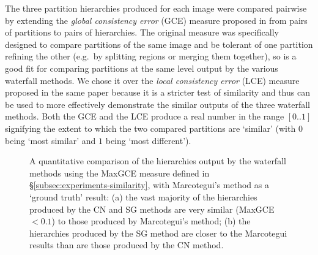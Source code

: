 \documentclass[preprint,a4paper]{elsarticle}
\newenvironment{stusubfig}[1]
{
	\begin{figure}[#1]
	\begin{center}
}
{
	\end{center}
	\end{figure}
}
\begin{document}
The three partition hierarchies produced for each image were compared pairwise by extending the \emph{global consistency error} (GCE) measure proposed in \cite{martin01} from pairs of partitions to pairs of hierarchies. The original measure was specifically designed to compare partitions of the same image and be tolerant of one partition refining the other (e.g.~by splitting regions or merging them together), so is a good fit for comparing partitions at the same level output by the various waterfall methods. We chose it over the \emph{local consistency error} (LCE) measure proposed in the same paper because it is a stricter test of similarity and thus can be used to more effectively demonstrate the similar outputs of the three waterfall methods. Both the GCE and the LCE produce a real number in the range $[0..1]$ signifying the extent to which the two compared partitions are `similar' (with $0$ being `most similar' and $1$ being `most different').

\begin{stusubfig}{!t}
	\hspace{4mm}%
\caption{A quantitative comparison of the hierarchies output by the waterfall methods using the MaxGCE measure defined in \S\ref{subsec:experiments-similarity}, with Marcotegui's method as a `ground truth' result: (a) the vast majority of the hierarchies produced by the CN and SG methods are very similar (MaxGCE $< 0.1$) to those produced by Marcotegui's method; (b) the hierarchies produced by the SG method are closer to the Marcotegui results than are those produced by the CN method.}
\label{fig:quantitative-comparison}
\end{stusubfig}
\end{document}
